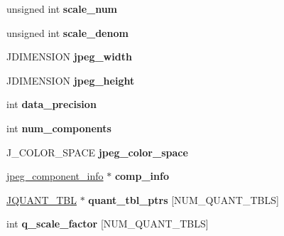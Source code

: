 \begin{DoxyCompactItemize}
unsigned int {\bfseries scale\+\_\+num}
\item 
\mbox{\label{structjpeg__compress__struct_ab30f569483d6c25032aa2c18c885e91c}} 
unsigned int {\bfseries scale\+\_\+denom}
\item 
\mbox{\label{structjpeg__compress__struct_ab433b317fcbe32212122621e476ac9d8}} 
J\+D\+I\+M\+E\+N\+S\+I\+ON {\bfseries jpeg\+\_\+width}
\item 
\mbox{\label{structjpeg__compress__struct_abc2cf065c0faab28327f7238949f76d3}} 
J\+D\+I\+M\+E\+N\+S\+I\+ON {\bfseries jpeg\+\_\+height}
\item 
\mbox{\label{structjpeg__compress__struct_a64c5b59e436f7d3d1d38b58d49993469}} 
int {\bfseries data\+\_\+precision}
\item 
\mbox{\label{structjpeg__compress__struct_a524f0284a6fcf96b21c8a745282c15e2}} 
int {\bfseries num\+\_\+components}
\item 
\mbox{\label{structjpeg__compress__struct_a7fb5305ec135340eddc2ebabec6a84d7}} 
J\+\_\+\+C\+O\+L\+O\+R\+\_\+\+S\+P\+A\+CE {\bfseries jpeg\+\_\+color\+\_\+space}
\item 
\mbox{\label{structjpeg__compress__struct_a4d37d3f336cc11acafef541bf8ed38cc}} 
\hyperlink{structjpeg__component__info}{jpeg\+\_\+component\+\_\+info} $\ast$ {\bfseries comp\+\_\+info}
\item 
\mbox{\label{structjpeg__compress__struct_a70a194c6a9c1744e1ed3a97232fb97f5}} 
\hyperlink{struct_j_q_u_a_n_t___t_b_l}{J\+Q\+U\+A\+N\+T\+\_\+\+T\+BL} $\ast$ {\bfseries quant\+\_\+tbl\+\_\+ptrs} \mbox{[}N\+U\+M\+\_\+\+Q\+U\+A\+N\+T\+\_\+\+T\+B\+LS\mbox{]}
\item 
\mbox{\label{structjpeg__compress__struct_a3d8545504353556fae60e1e865d2c600}} 
int {\bfseries q\+\_\+scale\+\_\+factor} \mbox{[}N\+U\+M\+\_\+\+Q\+U\+A\+N\+T\+\_\+\+T\+B\+LS\mbox{]}
\item 
\mbox{\label{structjpeg__compress__struct_a6a69e90a68e1f7f46774d83ba3737a4e}} 

\end{DoxyCompactItemize}
